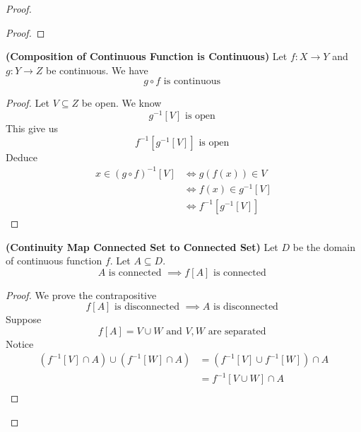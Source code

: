 \documentclass{report}
\begin{document}
\begin{proof}
\begin{proof}
\end{proof}
\begin{theorem}
\label{2.4.5}
\textbf{(Composition of Continuous Function is Continuous)} Let $f:X\rightarrow Y$ and $g:Y\rightarrow Z$ be continuous. We have
\begin{equation*}
g\circ f\text{ is continuous }
\end{equation*}
\end{theorem}
\begin{proof}
Let $V\subseteq Z$ be open. We know 
\begin{equation*}
g^{-1}[V]\text{ is open }
\end{equation*}
This give us
\begin{equation*}
f^{-1}[g^{-1}[V]]\text{ is open }
\end{equation*}
Deduce
\begin{align*}
  x\in (g\circ f)^{-1}[V]&\iff g(f(x))\in V\\
  &\iff f(x)\in g^{-1}[V]\\
  &\iff f^{-1}[g^{-1}[V]]
\end{align*}
\end{proof}
\begin{theorem}
\label{2.4.6}
\textbf{(Continuity Map Connected Set to Connected Set)} Let $D$ be the domain of continuous function $f$. Let $A\subseteq D$.  
 \begin{equation*}
A\text{ is connected }\implies f[A]\text{ is connected }
\end{equation*}
\end{theorem}
\begin{proof}
We prove the contrapositive
\begin{equation*}
f[A]\text{ is disconnected }\implies A\text{ is disconnected }
\end{equation*}
Suppose 
\begin{equation*}
f[A]=V\cup W\text{ and $V,W$ are separated }
\end{equation*}
Notice
\begin{align*}
  (f^{-1}[V]\cap A)\cup (f^{-1}[W]\cap A)&=(f^{-1}[V]\cup  f^{-1}[W])\cap A\\
  &=f^{-1}[V \cup W]\cap A\\

\end{align*}
\end{proof}
\end{proof}
\end{document}

